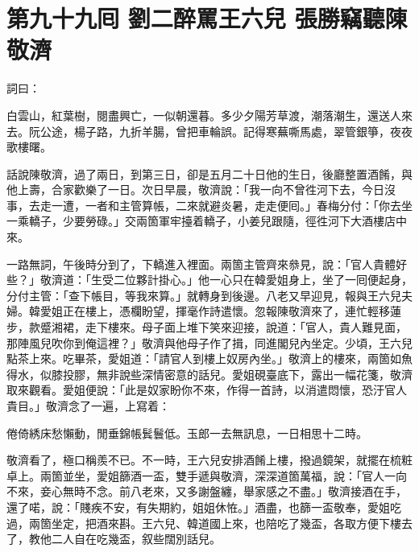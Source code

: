 
\chapter*{第九十九囘 劉二醉罵王六兒 張勝竊聽陳敬濟}


詞曰：

\begin{myquote}
白雲山，紅葉樹，閱盡興亡，一似朝還暮。多少夕陽芳草渡，潮落潮生，還送人來去。阮公途，楊子路，九折羊腸，曾把車輪誤。記得寒蕪嘶馬處，翠管銀箏，夜夜歌樓曙。

\end{myquote}

話說陳敬濟，過了兩日，到第三日，卻是五月二十日他的生日，後廳整置酒餚，與他上壽，合家歡樂了一日。次日早晨，敬濟說：「我一向不曾徃河下去，今日沒事，去走一遭，一者和主管算帳，二來就避炎暑，走走便囘。」春梅分付：「你去坐一乘轎子，少要勞碌。」交兩箇軍牢擡着轎子，小姜兒跟隨，徑徃河下大酒樓店中來。

一路無詞，午後時分到了，下轎進入裡面。兩箇主管齊來叅見，說：「官人貴體好些？」敬濟道：「生受二位夥計掛心。」他一心只在韓愛姐身上，坐了一囘便起身，分付主管：「查下帳目，等我來算。」就轉身到後邊。八老又早迎見，報與王六兒夫婦。韓愛姐正在樓上，憑欄盼望，揮毫作詩遣懷。忽報陳敬濟來了，連忙輕移蓮步，款蹙湘裙，走下樓來。母子面上堆下笑來迎接，說道：「官人，貴人難見面，那陣風兒吹你到俺這裡？」敬濟與他母子作了揖，同進閣兒內坐定。少頃，王六兒點茶上來。吃畢茶，愛姐道：「請官人到樓上奴房內坐。」敬濟上的樓來，兩箇如魚得水，似膝投膠，無非說些深情密意的話兒。愛姐硯臺底下，露出一幅花箋，敬濟取來觀看。愛姐便說：「此是奴家盼你不來，作得一首詩，以消遣悶懷，恐汙官人貴目。」敬濟念了一遍，上寫着：

\begin{myquote}[\markfont]
倦倚綉床愁懶動，閒垂錦帳鬂鬟低。玉郎一去無訊息，一日相思十二時。
\end{myquote}

敬濟看了，極口稱羨不已。不一時，王六兒安排酒餚上樓，撥過鏡架，就擺在梳粧卓上。兩箇並坐，愛姐篩酒一盃，雙手遞與敬濟，深深道箇萬福，說：「官人一向不來，妾心無時不念。前八老來，又多謝盤纏，舉家感之不盡。」敬濟接酒在手，還了喏，說：「賤疾不安，有失期約，姐姐休恠。」酒盡，也篩一盃敬奉，愛姐吃過，兩箇坐定，把酒來斟。王六兒、韓道國上來，也陪吃了幾盃，各取方便下樓去了，{}教他二人自在吃幾盃，叙些闊別話兒。

